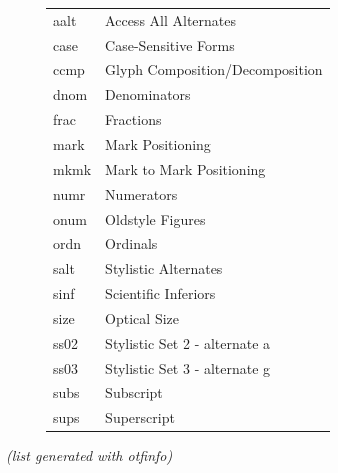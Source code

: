 \documentclass[11pt,a4paper,english]{article}
\begin{document}
\begin{figure}[ht]
	\centering
	\begin{tabular}{>{\ttfamily}l l}
		aalt & Access All Alternates \\
		case & Case-Sensitive Forms \\
		ccmp & Glyph Composition/Decomposition \\
		dnom & Denominators \\
		frac & Fractions \\
		mark & Mark Positioning \\
		mkmk & Mark to Mark Positioning \\
		numr & Numerators \\
		onum & Oldstyle Figures \\
		ordn & Ordinals \\
		salt & Stylistic Alternates \\
		sinf & Scientific Inferiors \\
		size & Optical Size \\
		ss02 & Stylistic Set 2 - alternate a \\
		ss03 & Stylistic Set 3 - alternate g \\
		subs & Subscript \\
		sups & Superscript	
	\end{tabular}
\end{figure}
\textit{(list generated with otfinfo)}
\end{document}
